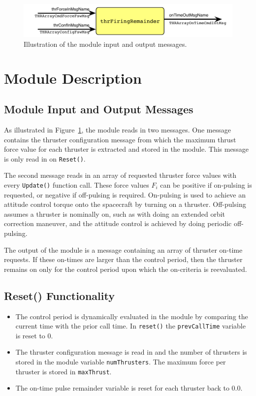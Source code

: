 

\begin{figure}[h]
	\centerline{
		\includegraphics{Figures/moduleImg}
	}
	\caption{Illustration of the module input and output messages.}
	\label{fig:moduleImg}
\end{figure}


\section{Module Description}
\subsection{Module Input and Output Messages}
As illustrated in Figure~\ref{fig:moduleImg}, the module reads in two messages.  One message contains the thruster configuration message from which the maximum thrust force value for each thruster is extracted and stored in the module.  This message is only read in on {\tt Reset()}.  

The second message reads in an array of requested thruster force values with every {\tt Update()} function call.  These force values $F_{i}$ can be positive if on-pulsing is requested, or negative if off-pulsing is required.  On-pulsing is used to achieve an attitude control torque onto the spacecraft by turning on a thruster.  Off-pulsing assumes a thruster is nominally on, such as with doing an extended orbit correction maneuver, and the attitude control is achieved by doing periodic off-pulsing.  

The output of the module is a message containing an array of thruster on-time requests.  If these on-times are larger than the control period, then the thruster remains on only for the control period upon which the on-criteria is reevaluated.  


\subsection{Reset() Functionality}
\begin{itemize}
	\item The control period is dynamically evaluated in the module by comparing the current time with the prior call time.  In {\tt reset()} the {\tt prevCallTime} variable is reset to 0.  
	\item The thruster configuration message is read in and the number of thrusters is stored in the module variable {\tt numThrusters}.  The maximum force per thruster is stored in {\tt maxThrust}.
	\item The on-time pulse remainder variable is reset for each thruster back to 0.0.
\end{itemize}

